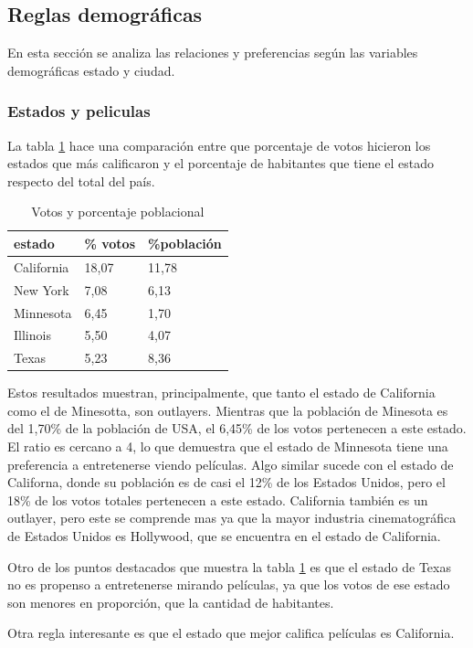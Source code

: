 \documentclass[journal]{IEEEtran}
\begin{document}
\subsection{Reglas demográficas}
En esta sección se analiza las relaciones y preferencias según las variables 
demográficas estado y ciudad. 

\subsubsection{Estados y peliculas}
La tabla \ref{table_state_population} hace una comparación entre que porcentaje
de votos hicieron los estados que más calificaron y el porcentaje de habitantes
que tiene el estado respecto del total del país.

\begin{table}[ht!]
\caption{Votos y porcentaje poblacional}
\label{table_state_population}
\centering
\begin{tabular}{l l l}
estado & \% votos & \%población  \\
\hline
California & 18,07 & 11,78 \\
New York & 7,08 & 6,13 \\
Minnesota & 6,45 & 1,70 \\
Illinois & 5,50 & 4,07 \\
Texas & 5,23 & 8,36
\end{tabular}
\end{table}

Estos resultados muestran, principalmente, que tanto el estado de California
como el de Minesotta, son outlayers. Mientras que la población de
Minesota es del 1,70\% de la población de USA, el 6,45\% de los votos pertenecen
a este estado. El ratio es cercano a 4, lo que demuestra
que el estado de Minnesota tiene una preferencia a entretenerse viendo películas.
Algo similar sucede con el estado de Californa, donde su población es de casi el
12\% de los Estados Unidos, pero el 18\% de los votos totales pertenecen a este
estado. California también es un outlayer, pero este se comprende mas ya que la
mayor industria cinematográfica de Estados Unidos es Hollywood, que se encuentra
en el estado de California.

Otro de los puntos destacados que muestra la tabla \ref{table_state_population} es
que el estado de Texas no es propenso a entretenerse mirando películas, ya que los
votos de ese estado son menores en proporción, que la cantidad de habitantes.

Otra regla interesante es que el estado que mejor califica películas es California.
\end{document}

